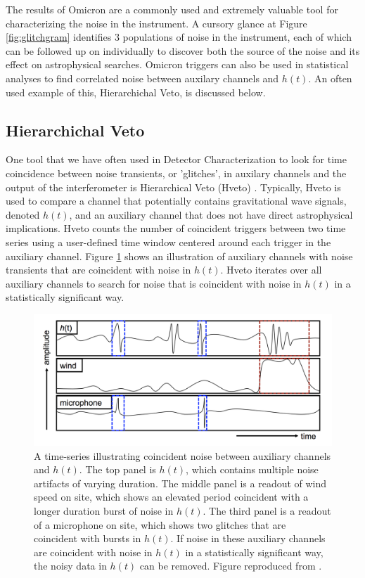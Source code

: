 The results of Omicron are a commonly used and extremely valuable tool 
for characterizing the noise in the instrument. A cursory glance at 
Figure \ref{fig:glitchgram} identifies 3 populations of noise in 
the instrument, each of which can be followed up on individually 
to discover both the source of the noise and its effect on astrophysical 
searches. Omicron triggers can also be used in statistical analyses to 
find correlated noise between auxilary channels and $h(t)$. An often used 
example of this, Hierarchichal Veto, is discussed below. 

\subsection{Hierarchichal Veto}

One tool that we have often used in Detector Characterization to look 
for time coincidence between noise transients, or 'glitches', in auxilary 
channels and the output of the interferometer is Hierarchical Veto (Hveto) 
\cite{Smith:2011}. 
Typically, Hveto is used to compare a channel that potentially contains 
gravitational wave signals, denoted $h(t)$, and an auxiliary channel 
that does not have direct astrophysical implications. Hveto counts 
the number of coincident triggers between two time series using a 
user-defined time window centered around each trigger in the auxiliary 
channel. 
Figure \ref{fig:hveto-aux} shows an illustration of auxiliary channels 
with noise transients that are coincident with noise in $h(t)$. Hveto 
iterates over all auxiliary channels to search for noise that is coincident 
with noise in $h(t)$ in a statistically significant way.

\begin{figure}[ht!]
\includegraphics[width=\textwidth]{figures/detchar/hveto_example}
\caption[Example of coincident noise]{A time-series illustrating coincident noise %
         between auxiliary channels and $h(t)$. The top panel is $h(t)$, which contains %
         multiple noise artifacts of varying duration. The middle panel is a readout of %
         wind speed on site, which shows an elevated period coincident with a longer duration %
         burst of noise in $h(t)$. The third panel is a readout of a microphone on site, %
         which shows two glitches that are coincident with bursts in $h(t)$. If noise in %
         these auxiliary channels are coincident with noise in $h(t)$ in a statistically %
         significant way, the noisy data in $h(t)$ can be removed. Figure reproduced from %
         \cite{Smith:2011}.
         }
\label{fig:hveto-aux}
\end{figure}

